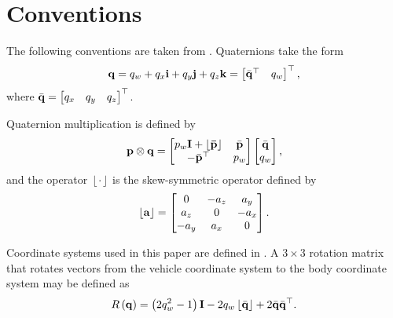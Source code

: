 \documentclass[english]{article}
\begin{document}
\section{Conventions}

The following conventions are taken from \cite{key-2}. Quaternions take the form
\begin{equation}
{\bf{q}} = q_w + q_x{\bf{i}} + q_y{\bf{j}} + q_z{\bf{k}} = \begin{bmatrix} \bar{\bf{q}}^\top & q_w \end{bmatrix}^\top,
\end{equation}
where $\bar{\bf{q}} = \begin{bmatrix} q_x & q_y & q_z \end{bmatrix}^\top$.

Quaternion multiplication is defined by
\begin{equation}
{\bf{p}}\otimes{\bf{q}} = \begin{bmatrix} p_w\bf{I} + \left\lfloor \bar{\bf{p}} \right\rfloor & \bar{\bf{p}} \\ -\bar{\bf{p}}^\top & p_w \end{bmatrix} \begin{bmatrix} \bar{\bf{q}} \\ q_w \end{bmatrix},
\end{equation}
and the operator $\left\lfloor\cdot\right\rfloor$ is the skew-symmetric operator defined by
\begin{equation}
\left\lfloor\bf{a}\right\rfloor = \begin{bmatrix} 0 & -a_z & a_y \\ a_z & 0 & -a_x \\ -a_y & a_x & 0 \end{bmatrix}.
\end{equation}

Coordinate systems used in this paper are defined in \cite{key-3}. A $3\times3$ rotation matrix that rotates vectors from the vehicle coordinate system to the body coordinate system may be defined as
\begin{equation}
R\left(\bf{q}\right) = \left(2q_w^2-1\right){\bf{I}} - 2q_w\left\lfloor\bar{\bf{q}}\right\rfloor + 2\bar{\bf{q}}\bar{\bf{q}}^\top.
\end{equation}
\end{document}
